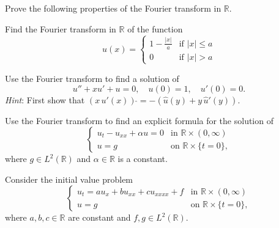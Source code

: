 \documentclass[12pt,fleqn,leqno]{exam}
\begin{document}
\begin{questions}

\question Prove the following properties of the Fourier transform in $\mathbb{R}$.

\question Find the Fourier transform in $\mathbb{R}$ of the function
\[u(x) = \begin{cases}
1-\frac{|x|}{a} & \text{if $|x| \leq a$} \\
0 & \text{if $|x| > a$}
\end{cases}\]

\question Use the Fourier transform to find a solution of
\[u'' + x u' + u = 0,\quad u(0) = 1,\quad u'(0) = 0.\] 
\emph{Hint}: First show that $(x\,u'(x))\,\hat{} = -(\hat{u}(y)+y\,\hat{u}'(y))$.

\question Use the Fourier transform to find an explicit formula for the solution of
\[\begin{cases}
u_t - u_{xx} + \alpha u = 0 & \text{in $\mathbb{R} \times (0,\infty)$} \\
u = g & \text{on $\mathbb{R} \times \{t = 0\}$},
\end{cases}\]
where $g \in L^2(\mathbb{R})$ and $\alpha \in \mathbb{R}$ is a constant.

\question Consider the initial value problem
\[\begin{cases}
u_t = a u_x + b u_{xx} + c u_{xxxx} + f & \text{in $\mathbb{R} \times (0,\infty)$} \\
u = g & \text{on $\mathbb{R} \times \{t = 0\}$},
\end{cases}\]
where $a, b, c \in \mathbb{R}$ are constant and $f,g \in L^2(\mathbb{R})$.



\end{questions}
\end{document}
